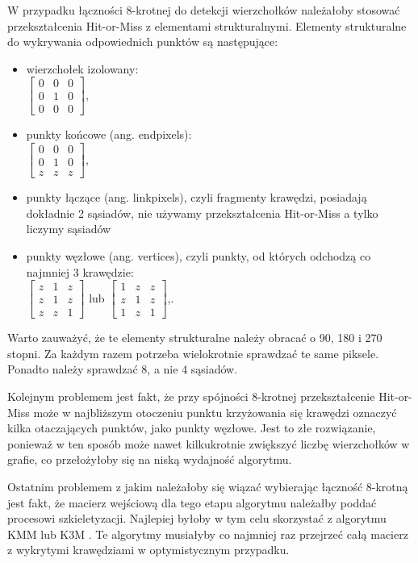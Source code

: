 \documentclass[a4paper,11pt,twoside,openright]{report}
\theoremstyle{definition}
\begin{document}
W przypadku łączności 8-krotnej do detekcji wierzchołków należałoby stosować przekształcenia Hit-or-Miss z elementami strukturalnymi. Elementy strukturalne do wykrywania odpowiednich punktów są następujące:
\begin{itemize}%
\item wierzchołek izolowany: \\
$
\begin{bmatrix}
0 & 0 & 0 \\
0 & 1 & 0 \\
0 & 0 & 0
\end{bmatrix}
$,
\item punkty końcowe (ang. endpixels): \\
$
\begin{bmatrix}
0 & 0 & 0 \\
0 & 1 & 0 \\
z & z & z
\end{bmatrix}
$,
\item punkty łączące (ang. linkpixels), czyli fragmenty krawędzi, posiadają dokładnie 2 sąsiadów, nie używamy przekształcenia Hit-or-Miss a tylko liczymy sąsiadów
\item punkty węzłowe (ang. vertices), czyli punkty, od których odchodzą co najmniej 3 krawędzie: \\
$
\begin{bmatrix}
z & 1 & z \\
z & 1 & z \\
z & z & 1
\end{bmatrix}
$ lub $
\begin{bmatrix}
1 & z & z \\
z & 1 & z \\
1 & z & 1
\end{bmatrix}
$,.
\end{itemize}

Warto zauważyć, że te elementy strukturalne należy obracać o 90, 180 i 270 stopni. Za każdym razem potrzeba wielokrotnie sprawdzać te same piksele. Ponadto należy sprawdzać 8, a nie 4 sąsiadów.

Kolejnym problemem jest fakt, że przy spójności 8-krotnej przekształcenie Hit-or-Miss może w najbliższym otoczeniu punktu krzyżowania się krawędzi oznaczyć kilka otaczających punktów, jako punkty węzłowe. Jest to złe rozwiązanie, ponieważ w ten sposób może nawet kilkukrotnie zwiększyć liczbę wierzchołków w grafie, co przełożyłoby się na niską wydajność algorytmu.

Ostatnim problemem z jakim należałoby się wiązać wybierając łączność 8-krotną jest fakt, że macierz wejściową dla tego etapu algorytmu należałby poddać procesowi szkieletyzacji. Najlepiej byłoby w tym celu skorzystać z algorytmu KMM \cite{KMM} lub K3M \cite{K3M}. Te algorytmy musiałyby co najmniej raz przejrzeć całą macierz z wykrytymi krawędziami w optymistycznym przypadku.
\end{document}
